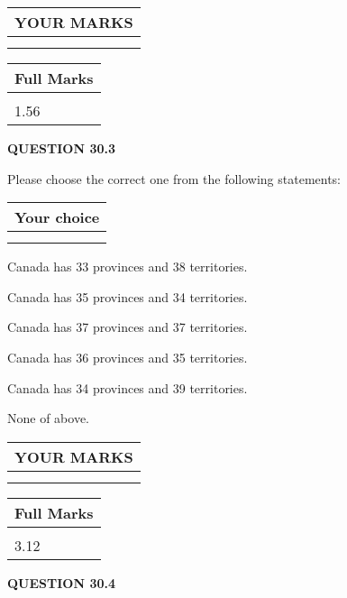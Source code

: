 \documentclass[12pt]{article}
\begin{document}
 
\vspace{0.3in}
  
\vspace{0.2in}
  
\noindent\begin{tabular}{|l|}
\hline
 YOUR MARKS  \\
\hline
 \\ 
 \\ 
\hline
\end{tabular}
\hspace{0.05in} \begin{tabular}{|l|}
\hline
 Full Marks  \\
\hline
 \\ 
1.56 \\
\hline
\end{tabular}
{\textbf{\Large{QUESTION
30.3 
}}}
  
  
Please choose the correct one from the following statements:
  
  
\noindent\hspace{3.0in} \begin{tabular}{|l|}
\hline
Your choice \\
\hline
 \\ 
 \\ 
\hline
\end{tabular}
  
  
 
 
Canada has  %
33 provinces and  %
38 territories.
 
 
Canada has  %
35 provinces and  %
34 territories.
 
 
Canada has  %
37 provinces and  %
37 territories.
 
 
Canada has  %
36 provinces and  %
35 territories.
 
 
Canada has  %
34 provinces and  %
39 territories.
 
 
 None of above.
 
 
  
\vspace{0.2in}
  
\noindent\begin{tabular}{|l|}
\hline
 YOUR MARKS  \\
\hline
 \\ 
 \\ 
\hline
\end{tabular}
\hspace{0.05in} \begin{tabular}{|l|}
\hline
 Full Marks  \\
\hline
 \\ 
3.12 \\
\hline
\end{tabular}
{\textbf{\Large{QUESTION
30.4 
}}}
  
\end{document}
